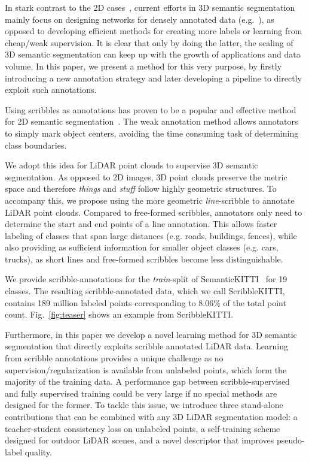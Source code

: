 \documentclass[10pt,twocolumn,letterpaper]{article}
\begin{document}
In stark contrast to the 2D cases~\cite{cvpr2016scribblesup, iccv2015boxsup, arxiv2015weaklyandsemi, cvpr2018imagelevel}, current efforts in 3D semantic segmentation mainly focus on designing networks for densely annotated data (e.g.~\cite{cvpr2021cylindrical, eccv2020spvnas, wacv2021improving}), as opposed to developing efficient methods for creating more labels or learning from cheap/weak supervision. It is clear that only by doing the latter, the scaling of 3D semantic segmentation can keep up with the growth of applications and data volume.
In this paper, we present a method for this very purpose, by firstly introducing a new annotation strategy and later developing a pipeline to directly exploit such annotations.

Using scribbles as annotations has proven to be a popular and effective method for 2D semantic segmentation~\cite{cvpr2016scribblesup, miccai2020scribble2label, dlmia2018medicalscribble}. The weak annotation method allows annotators to simply mark object centers, avoiding the time consuming task of determining class boundaries. 

We adopt this idea for LiDAR point clouds to supervise 3D semantic segmentation. As opposed to 2D images, 3D point clouds preserve the metric space and therefore \textit{things} and \textit{stuff} follow highly geometric structures. To accompany this, we propose using the more geometric \textit{line}-scribble to annotate LiDAR point clouds. Compared to free-formed scribbles, annotators only need to determine the start and end points of a line annotation. This allows faster labeling of classes that span large distances (e.g. roads, buildings, fences), while also providing as sufficient information for smaller object classes (e.g. cars, trucks), as short lines and free-formed scribbles become less distinguishable.

We provide scribble-annotations for the \textit{train}-split of SemanticKITTI~\cite{iccv2019semantickitti} for 19 classes. The resulting scribble-annotated data, which we call ScribbleKITTI, contains 189 million labeled points corresponding to 8.06\% of the total point count. Fig.~\ref{fig:teaser} shows an example from ScribbleKITTI.

Furthermore, in this paper we develop a novel learning method for 3D semantic segmentation that directly exploits scribble annotated LiDAR data. Learning from scribble annotations provides a unique challenge as no supervision/regularization is available from unlabeled points, which form the majority of the training data. A performance gap between scribble-supervised and fully supervised training could be very large if no special methods are designed for the former. To tackle this issue, we introduce three stand-alone contributions that can be combined with any 3D LiDAR segmentation model: a teacher-student consistency loss on unlabeled points, a self-training scheme designed for outdoor LiDAR scenes, and a novel descriptor that improves pseudo-label quality.
\end{document}
